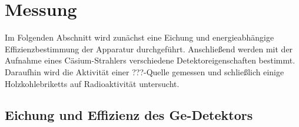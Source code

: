\section{Messung}
\label{sec:messung}
Im Folgenden Abschnitt wird zunächst eine Eichung und energieabhängige Effizienzbestimmung der Apparatur durchgeführt. Anschließend werden mit der Aufnahme eines Cäsium-Strahlers verschiedene Detektoreigenschaften bestimmt.
Daraufhin wird die Aktivität einer ???-Quelle gemessen und schließlich einige Holzkohlebriketts auf Radioaktivität untersucht.

\subsection{Eichung und Effizienz des Ge-Detektors}
\label{subse:eichung}
